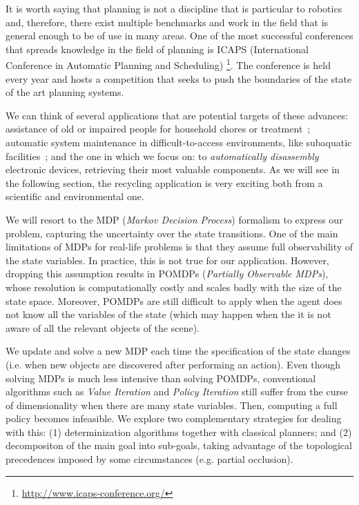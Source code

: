 \documentclass[../root.tex]{subfiles}
\begin{document}
It is worth saying that planning is not a discipline that is particular to
robotics and, therefore, there exist multiple benchmarks and work in the
field that is general enough to be of use in many areas. One of the
most successful conferences that spreads knowledge in the field of planning is
ICAPS (International Conference in Automatic Planning and Scheduling)
\footnote{\url{http://www.icaps-conference.org/}}. The conference is
held every year and hosts a competition that seeks to push the boundaries
of the state of the art planning systems.

We can think of several applications that are potential targets
of these advances: assistance of old or impaired people for household chores
or treatment~\cite{canal2018adapting,andriella2018deciding}; automatic system
maintenance in difficult-to-access environments, like
subaquatic facilities~\cite{palomeras2016toward,ong2010planning}; and the one
in which we focus on: to \emph{automatically disassembly} electronic devices,
retrieving their most valuable components. As we will see in the following
section, the recycling application is very exciting both from a scientific
and environmental one.

We will resort to the MDP (\emph{Markov Decision Process})
formalism to express our problem, capturing the uncertainty over
the state transitions.
One of the main limitations of MDPs for
real-life problems is that they assume full observability of the state variables.
In practice, this is not true for our application. However, dropping this
assumption results in POMDPs
(\emph{Partially Observable MDPs}), whose resolution is computationally costly
and scales badly with the size of the state space. Moreover, POMDPs are
still difficult to apply when the agent does not know all
the variables of the state (which may happen when the it is not aware of all
the relevant objects of the scene).

We update and solve a new MDP each
time the specification of the state changes (i.e. when new objects are discovered
after performing an action). Even though solving MDPs is much less intensive than
solving POMDPs, conventional algorithms such as \emph{Value Iteration} and
\emph{Policy Iteration} still suffer from the curse of dimensionality when there
are many state variables. Then, computing a full policy becomes infeasible.
We explore two complementary strategies for dealing with this: (1)
determinization algorithms together with classical planners; and (2)
decompositon of the main goal into sub-goals, taking advantage of the
topological precedences imposed by some circumstances (e.g. partial
occlusion).
\end{document}
